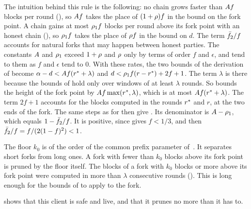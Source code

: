 The intuition behind this rule is the following: no chain grows faster than
$A f$ blocks per round (), so $A f$ takes the place of
$(1+\rho)f$ in the bound on the fork point. A chain gains at most $\rho_1 f$
blocks per round above its fork point with an honest chain
(), so $\rho_1 f$ takes the place of $\rho f$ in
the bound on $d$. The term $\bar{f}_2/f$ accounts for natural forks that may happen
between honest parties. The constants $A$ and $\rho_1$ exceed $1+\rho$
and $\rho$ only by terms of order $f$ and $\epsilon$, and tend to them as $f$
and $\epsilon$ tend to $0$. With these rates, the two bounds of the derivation
of  become $\alpha-d<A f(r^{*}+\lambda)$ and
$d<\rho_1 f(r-r^{*})+2f+1$. The term $\lambda$ is there because the bounds of
 hold only over windows of at least $\lambda$ rounds. So
 bounds the height of the fork point by
$A f\max(r^{*},\lambda)$, which is at most $A f(r^{*}+\lambda)$. The term
$2f+1$ accounts for the blocks computed in the rounds $r^{*}$ and $r$, at the
two ends of the fork. The same steps as for  then give
. Its denominator is $A-\rho_1$, which equals
$1-\bar{f}_2/f$. It is positive, since  gives $f<1/3$, and then
$\bar{f}_2/f=f/(2(1-f)^2)<1$.

The floor $k_0$ is of the order of the common prefix parameter
of~\cite{gkl24}. It separates short forks from long ones. A fork with fewer
than $k_0$ blocks above its fork point is pruned by the floor itself. The
blocks of a fork with $k_0$ blocks or more above its fork point were computed in
more than $\lambda$ consecutive rounds (). This is long enough
for the bounds of  to apply to the fork.



 shows that this client is safe and live, and
 that it prunes no more than it has to.
